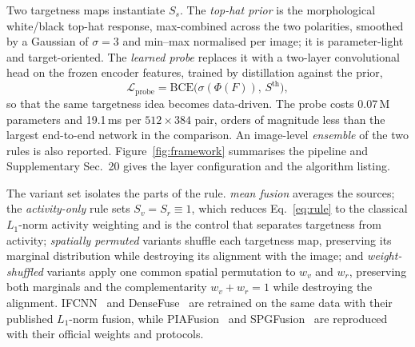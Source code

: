 \documentclass[10pt,a4paper]{article}
\begin{document}
\begin{sloppypar}
Two targetness maps instantiate $S_s$. The \emph{top-hat prior} is the morphological
white/black top-hat response, max-combined across the two polarities, smoothed by a
Gaussian of $\sigma=3$ and min--max normalised per image; it is parameter-light and
target-oriented. The \emph{learned probe} replaces it with a two-layer convolutional
head on the frozen encoder features, trained by distillation against the prior,
\begin{equation}
\mathcal{L}_{\mathrm{probe}}=\mathrm{BCE}\big(\sigma(\Phi(F)),\,S^{\mathrm{th}}\big),
\end{equation}
so that the same targetness idea becomes data-driven. The probe costs 0.07\,M
parameters and 19.1\,ms per $512\times384$ pair, orders of magnitude less than the
largest end-to-end network in the comparison. An image-level \emph{ensemble} of the
two rules is also reported. Figure~\ref{fig:framework} summarises the pipeline and
Supplementary Sec.~20 gives the layer configuration and the algorithm listing.
\end{sloppypar}

\begin{sloppypar}
The variant set isolates the parts of the rule. \emph{mean fusion} averages the
sources; the \emph{activity-only} rule sets $S_v=S_r\equiv1$, which reduces
Eq.~\eqref{eq:rule} to the classical $L_1$-norm activity weighting and is the control
that separates targetness from activity; \emph{spatially permuted} variants shuffle
each targetness map, preserving its marginal distribution while destroying its
alignment with the image; and \emph{weight-shuffled} variants apply one common spatial
permutation to $w_v$ and $w_r$, preserving both marginals and the complementarity
$w_v+w_r=1$ while destroying the alignment. IFCNN~\cite{zhang2020} and
DenseFuse~\cite{li2019} are retrained on the same data with their published
$L_1$-norm fusion, while PIAFusion~\cite{tang2022} and SPGFusion~\cite{zhang2026} are
reproduced with their official weights and protocols.
\end{sloppypar}
\end{document}
